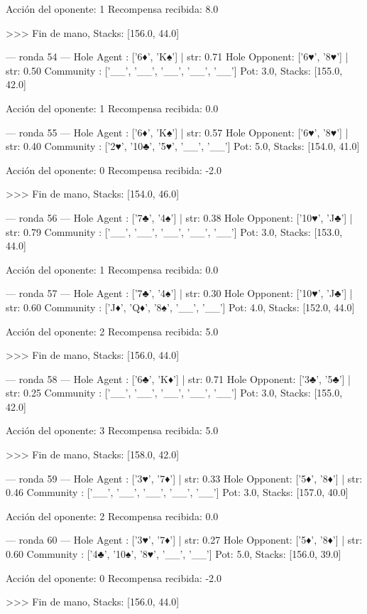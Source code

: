 Acción del oponente: 1
Recompensa recibida: 8.0

>>> Fin de mano, Stacks: [156.0, 44.0]


--- ronda 54 ---
Hole Agent : ['6♦', 'K♠'] | str: 0.71
Hole Opponent: ['6♥', '8♥'] | str: 0.50
Community  : ['__', '__', '__', '__', '__']
Pot: 3.0, Stacks: [155.0, 42.0]

Acción del oponente: 1
Recompensa recibida: 0.0

--- ronda 55 ---
Hole Agent : ['6♦', 'K♠'] | str: 0.57
Hole Opponent: ['6♥', '8♥'] | str: 0.40
Community  : ['2♥', '10♣', '5♥', '__', '__']
Pot: 5.0, Stacks: [154.0, 41.0]

Acción del oponente: 0
Recompensa recibida: -2.0

>>> Fin de mano, Stacks: [154.0, 46.0]


--- ronda 56 ---
Hole Agent : ['7♣', '4♠'] | str: 0.38
Hole Opponent: ['10♥', 'J♣'] | str: 0.79
Community  : ['__', '__', '__', '__', '__']
Pot: 3.0, Stacks: [153.0, 44.0]

Acción del oponente: 1
Recompensa recibida: 0.0

--- ronda 57 ---
Hole Agent : ['7♣', '4♠'] | str: 0.30
Hole Opponent: ['10♥', 'J♣'] | str: 0.60
Community  : ['J♦', 'Q♦', '8♠', '__', '__']
Pot: 4.0, Stacks: [152.0, 44.0]

Acción del oponente: 2
Recompensa recibida: 5.0

>>> Fin de mano, Stacks: [156.0, 44.0]


--- ronda 58 ---
Hole Agent : ['6♣', 'K♦'] | str: 0.71
Hole Opponent: ['3♣', '5♣'] | str: 0.25
Community  : ['__', '__', '__', '__', '__']
Pot: 3.0, Stacks: [155.0, 42.0]

Acción del oponente: 3
Recompensa recibida: 5.0

>>> Fin de mano, Stacks: [158.0, 42.0]


--- ronda 59 ---
Hole Agent : ['3♥', '7♦'] | str: 0.33
Hole Opponent: ['5♦', '8♦'] | str: 0.46
Community  : ['__', '__', '__', '__', '__']
Pot: 3.0, Stacks: [157.0, 40.0]

Acción del oponente: 2
Recompensa recibida: 0.0

--- ronda 60 ---
Hole Agent : ['3♥', '7♦'] | str: 0.27
Hole Opponent: ['5♦', '8♦'] | str: 0.60
Community  : ['4♣', '10♠', '8♥', '__', '__']
Pot: 5.0, Stacks: [156.0, 39.0]

Acción del oponente: 0
Recompensa recibida: -2.0

>>> Fin de mano, Stacks: [156.0, 44.0]


